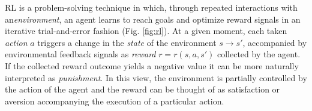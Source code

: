 \documentclass[10pt,letterpaper]{article}
\begin{document}
RL is a problem-solving technique in which,
through repeated interactions with an\textit{environment},
an agent learns to reach goals and optimize reward signals
in an iterative trial-and-error fashion (Fig. \ref{fig:rl}).
At a given moment, each taken \textit{action} $a$ triggers a change
in the \textit{state} of the environment
$s \rightarrow s'$, accompanied by environmental feedback signals as \textit{reward}
$r = r(s, a,s')$ collected by the agent.
If the collected reward outcome yields a negative value it can be
more naturally interpreted as \textit{punishment}.
In this view, the environment is partially controlled by
the action of the agent and the reward can be thought
of as satisfaction \textemdash or aversion \textemdash accompanying the execution of
a particular action.
\end{document}
